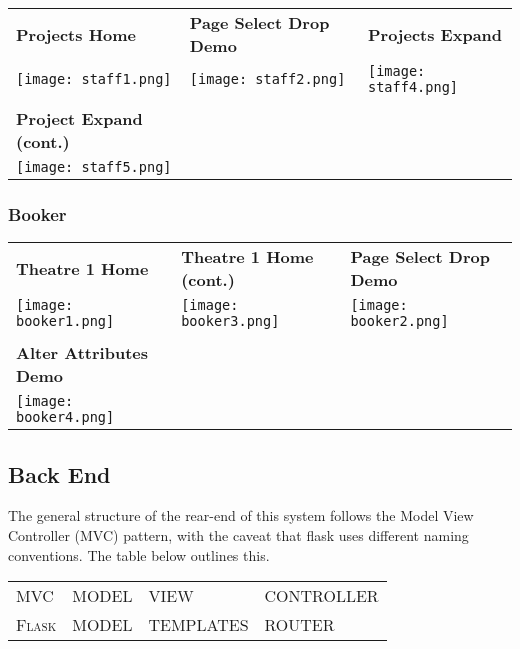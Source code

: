 \documentclass[11pt, english]{article}
\begin{document}
	\begin{center}
        	\scriptsize
        \begin{longtable}{p{5cm}p{5cm}p{5cm}}
                \textbf{Projects Home} & \textbf{Page Select Drop Demo} & \textbf{Projects Expand}\\
		\texttt{[image: staff1.png]} & \texttt{[image: staff2.png]} & \texttt{[image: staff4.png]}\\
		& \\
		\textbf{Project Expand (cont.)}\\
		\texttt{[image: staff5.png]}\\
        \end{longtable}
        \end{center}

\newpage

		\subsubsection{Booker}

	\begin{center}
        	\scriptsize
        \begin{longtable}{p{5cm}p{5cm}p{5cm}}
		\textbf{Theatre 1 Home} & \textbf{Theatre 1 Home (cont.)} & \textbf{Page Select Drop Demo}\\
		\texttt{[image: booker1.png]} & \texttt{[image: booker3.png]} & \texttt{[image: booker2.png]}\\
		& \\
                \textbf{Alter Attributes Demo}\\
		\texttt{[image: booker4.png]}\\
        \end{longtable}
        \end{center}

	\subsection{Back End}

	The general structure of the rear-end of this system follows the Model View Controller (MVC) pattern, with the caveat that flask uses different naming conventions. The table below outlines this.\\

	\begin{center}
	\begin{tabular}{p{2cm}|p{2cm}p{2.5cm}p{2cm}}
		\textsc{MVC} & MODEL & VIEW & CONTROLLER\\
		\textsc{Flask} & MODEL & TEMPLATES & ROUTER\\
	\end{tabular}
	\end{center}
\end{document}
